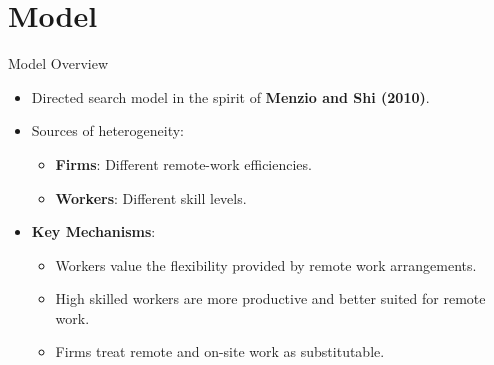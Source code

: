 \documentclass[aspectratio=1610]{beamer}
\begin{document}
\section{Model}
\begin{frame}{Model Overview}
  \begin{itemize}
    \item Directed search model in the spirit of \textbf{Menzio and Shi (2010)}.%
    \item Sources of heterogeneity:\vspace{0.3cm}
    \begin{itemize} 
      \item \textbf{Firms}: Different remote-work efficiencies.
      \item \textbf{Workers}: Different skill levels.
    \end{itemize}%
    \item \textbf{Key Mechanisms}:\vspace{0.3cm}
    \begin{itemize}
        \item  Workers value the flexibility provided by remote work arrangements.
        \item High skilled workers are more productive and better suited for remote work.
        \item Firms treat remote and on-site work as substitutable.
    \end{itemize}
  \end{itemize}
\end{frame}
\end{document}
